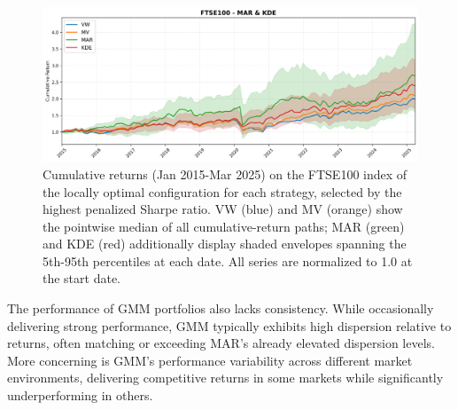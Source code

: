 \vspace{5mm}
\begin{figure}[H]
  \begin{center}
  \begin{minipage}{1\textwidth}
    \centering
    \includegraphics[width=\textwidth]{images/40_10.png}
  \end{minipage}
  \caption[Local best configuration - FTSE100 - Cumulative returns]{Cumulative returns (Jan 2015-Mar 2025) on the FTSE100 index of the locally optimal configuration for each strategy, selected by the highest penalized Sharpe ratio. VW (blue) and MV (orange) show the pointwise median of all cumulative-return paths; MAR (green) and KDE (red) additionally display shaded envelopes spanning the 5th-95th percentiles at each date. All series are normalized to 1.0 at the start date.}
  \label{fig:combined10}
  \end{center}
  \end{figure}

The performance of GMM portfolios also lacks consistency. While occasionally delivering strong performance, GMM typically exhibits high dispersion relative to returns, often matching or exceeding MAR's already elevated dispersion levels. More concerning is GMM's performance variability across different market environments, delivering competitive returns in some markets while significantly underperforming in others.

